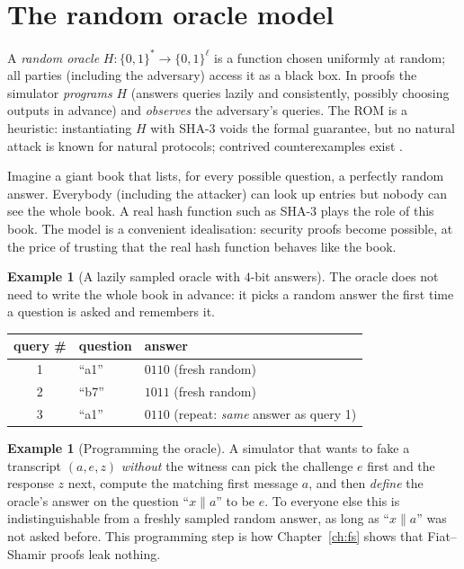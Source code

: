 \documentclass[11pt,a4paper]{report}
\theoremstyle{plain}
\theoremstyle{definition}
\newtheorem{example}[theorem]{Example}
\theoremstyle{remark}
\begin{document}
\section{The random oracle model}
A \emph{random oracle} $H:\{0,1\}^*\to\{0,1\}^\ell$ is a function chosen uniformly at random; all parties (including the adversary) access it as a black box. In proofs the simulator \emph{programs} $H$ (answers queries lazily and consistently, possibly choosing outputs in advance) and \emph{observes} the adversary's queries. The ROM is a heuristic: instantiating $H$ with SHA-3 voids the formal guarantee, but no natural attack is known for natural protocols; contrived counterexamples exist \cite{CGH04}.
\begin{plain}\PE
Imagine a giant book that lists, for every possible question, a perfectly random answer. Everybody (including the attacker) can look up entries but nobody can see the whole book. A real hash function such as SHA-3 plays the role of this book. The model is a convenient idealisation: security proofs become possible, at the price of trusting that the real hash function behaves like the book.
\end{plain}
\begin{example}[A lazily sampled oracle with $4$-bit answers]
The oracle does not need to write the whole book in advance: it picks a random answer the first time a question is asked and remembers it.
\begin{center}\small
\begin{tabular}{@{}c l l@{}}
\toprule
query \# & question & answer\\
\midrule
1 & ``a1'' & $0110$ (fresh random)\\
2 & ``b7'' & $1011$ (fresh random)\\
3 & ``a1'' & $0110$ (repeat: \emph{same} answer as query 1)\\
\bottomrule
\end{tabular}
\end{center}
\end{example}
\begin{example}[Programming the oracle]
A simulator that wants to fake a transcript $(a,e,z)$ \emph{without} the witness can pick the challenge $e$ first and the response $z$ next, compute the matching first message $a$, and then \emph{define} the oracle's answer on the question ``$x\|a$'' to be $e$. To everyone else this is indistinguishable from a freshly sampled random answer, as long as ``$x\|a$'' was not asked before. This programming step is how Chapter~\ref{ch:fs} shows that Fiat--Shamir proofs leak nothing.
\end{example}
\end{document}
